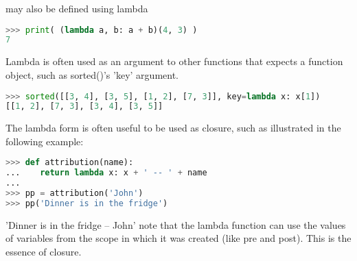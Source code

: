 may also be defined using lambda
\lstset{basicstyle=\scriptsize, numbers=left, captionpos=b, tabsize=4}
\begin{lstlisting}[caption=lamdba example,language={Python},
xleftmargin=15pt, label=lst:lamdbaexample]
>>> print( (lambda a, b: a + b)(4, 3) )
7
\end{lstlisting}

Lambda is often used as an argument to other functions that expects a function
object, such as sorted()'s 'key' argument.
\lstset{basicstyle=\scriptsize, numbers=left, captionpos=b, tabsize=4}
\begin{lstlisting}[caption=Sort with lambda,language={Python},
xleftmargin=15pt, label=lst:sortwithlambda]
>>> sorted([[3, 4], [3, 5], [1, 2], [7, 3]], key=lambda x: x[1])
[[1, 2], [7, 3], [3, 4], [3, 5]]
\end{lstlisting}

The lambda form is often useful to be used as closure, such as illustrated in
the following example:
\lstset{basicstyle=\scriptsize, numbers=left, captionpos=b, tabsize=4}
\begin{lstlisting}[caption=lambda Closure,language={Python},
xleftmargin=15pt, label=lst:lambdaclosure]
>>> def attribution(name):
...    return lambda x: x + ' -- ' + name
...
>>> pp = attribution('John')
>>> pp('Dinner is in the fridge')
\end{lstlisting}

'Dinner is in the fridge -- John' note that the lambda function can use the
values of variables from the scope in which it was created (like pre and post).
This is the essence of closure.
